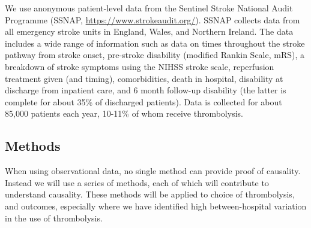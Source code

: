 We use anonymous patient-level data from the Sentinel Stroke National Audit Programme (SSNAP, \url{https://www.strokeaudit.org/}). SSNAP collects data from all emergency stroke units in England, Wales, and Northern Ireland. The data includes a wide range of information such as data on times throughout the stroke pathway from stroke onset, pre-stroke disability (modified Rankin Scale, mRS), a breakdown of stroke symptoms using the NIHSS stroke scale, reperfusion treatment given (and timing), comorbidities, death in hospital, disability at discharge from inpatient care, and 6 month follow-up disability (the latter is complete for about 35\% of discharged patients). Data is collected for about 85,000 patients each year, 10-11\% of whom receive thrombolysis.

\subsection{Methods}

When using observational data, no single method can provide proof of causality. Instead we will use a series of methods, each of which will contribute to understand causality. These methods will be applied to choice of thrombolysis, and outcomes, especially where we have identified high between-hospital variation in the use of thrombolysis. 

